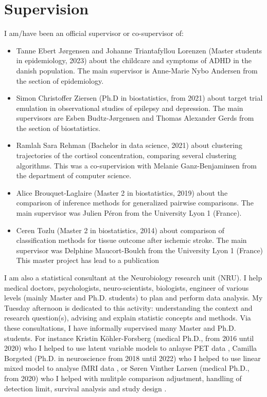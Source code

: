 \documentclass[12pt]{article}
\begin{document}

\section{Supervision}
\label{sec:org5d25eec}

I am/have been an official supervisor or co-supervisor of:
\begin{itemize}
\item Tanne Ebert Jørgensen and Johanne Triantafyllou Lorenzen (Master
students in epidemiology, 2023) about the childcare and symptoms of
ADHD in the danish population. The main supervisor is Anne-Marie
Nybo Andersen from the section of epidemiology.
\item Simon Christoffer Ziersen (Ph.D in biostatistics, from 2021) about
target trial emulation in observational studies of epilepsy and
depression. The main supervisors are Esben Budtz-Jørgensen and
Thomas Alexander Gerds from the section of biostatistics.
\item Ramlah Sara Rehman (Bachelor in data science, 2021) about clustering
trajectories of the cortisol concentration, comparing several
clustering algorithms. This was a co-supervision with Melanie
Ganz-Benjaminsen from the department of computer science.
\item Alice Brouquet-Laglaire (Master 2 in biostatistics, 2019) about the
comparison of inference methods for generalized pairwise
comparisons. The main supervisor was Julien Péron from the
University Lyon 1 (France).
\item Ceren Tozlu (Master 2 in biostatistics, 2014) about comparison of
classification methods for tissue outcome after ischemic stroke. The
main supervisor was Delphine Maucort-Boulch from the University Lyon
1 (France) This master project has lead to a publication
\citep{tozlu2019comparison}
\end{itemize}

\bigskip

I am also a statistical consultant at the Neurobiology research unit
(NRU). I help medical doctors, psychologists, neuro-scientists,
biologists, engineer of various levels (mainly Master and
Ph.D. students) to plan and perform data analysis. My Tuesday
afternoon is dedicated to this activity: understanding the context and
research question(s), advising and explain statistic concepts and
methods. \newline Via these consultations, I have informally
supervised many Master and Ph.D. students. For instance Kristin
Köhler-Forsberg (medical Ph.D., from 2016 until 2020) who I helped to
use latent variable models to anlayse PET data
\citep{kohler2023serotonin,kohler2022concurrent}, Camilla Borgsted
(Ph.D. in neuroscience from 2018 until 2022) who I helped to use
linear mixed model to analyse fMRI data \citep{borgsted2018amygdala}, or
Søren Vinther Larsen (medical Ph.D., from 2020) who I helped with
mulitple comparison adjustment, handling of detection limit, survival
analysis and study design \citep{larsen2020oral,larsen2022impact}.
\end{document}

